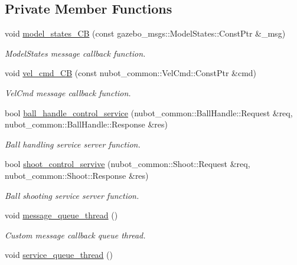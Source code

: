 \subsection*{Private Member Functions}
\begin{DoxyCompactItemize}
\item 
void \hyperlink{classgazebo_1_1NubotGazebo_a96b102bf11d96dda2cdab0f2f9460d8d}{model\-\_\-states\-\_\-\-C\-B} (const gazebo\-\_\-msgs\-::\-Model\-States\-::\-Const\-Ptr \&\-\_\-msg)
\begin{DoxyCompactList}\small\item\em Model\-States message callback function. \end{DoxyCompactList}\item 
void \hyperlink{classgazebo_1_1NubotGazebo_aafe5e8deca0e5a85a30c73629eee8703}{vel\-\_\-cmd\-\_\-\-C\-B} (const nubot\-\_\-common\-::\-Vel\-Cmd\-::\-Const\-Ptr \&cmd)
\begin{DoxyCompactList}\small\item\em Vel\-Cmd message callback function. \end{DoxyCompactList}\item 
bool \hyperlink{classgazebo_1_1NubotGazebo_ae042db5614aea3da7c8f547c44d9ff6e}{ball\-\_\-handle\-\_\-control\-\_\-service} (nubot\-\_\-common\-::\-Ball\-Handle\-::\-Request \&req, nubot\-\_\-common\-::\-Ball\-Handle\-::\-Response \&res)
\begin{DoxyCompactList}\small\item\em Ball handling service server function. \end{DoxyCompactList}\item 
bool \hyperlink{classgazebo_1_1NubotGazebo_ade096537ecc11263f1dd14428325329b}{shoot\-\_\-control\-\_\-servive} (nubot\-\_\-common\-::\-Shoot\-::\-Request \&req, nubot\-\_\-common\-::\-Shoot\-::\-Response \&res)
\begin{DoxyCompactList}\small\item\em Ball shooting service server function. \end{DoxyCompactList}\item 
void \hyperlink{classgazebo_1_1NubotGazebo_a2c87fbf2e13762d4827367028d493670}{message\-\_\-queue\-\_\-thread} ()
\begin{DoxyCompactList}\small\item\em Custom message callback queue thread. \end{DoxyCompactList}\item 
void \hyperlink{classgazebo_1_1NubotGazebo_abe786a1fbc3407f1b2ac655b1af15a8b}{service\-\_\-queue\-\_\-thread} ()

\end{DoxyCompactItemize}
